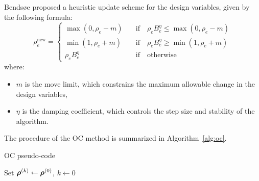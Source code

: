 \documentclass[mathpazo]{cicp}
\begin{document}
Bendsøe \cite{bendsoe1995optimization} proposed a heuristic update scheme for the design variables, given by the following formula:
\begin{equation*}
	\rho_e^{\mathrm{new}}=
	\begin{cases}
		\max(0,\rho_e-m)\quad&\text{if}\quad \rho_eB_e^\eta\leq\max(0,\rho_e-m)\\
		\min(1,\rho_e+m)\quad&\text{if}\quad\rho_eB_e^\eta \geq \min(1,\rho_e+m)\\
		\rho_eB_e^\eta\quad&\text{if}\quad\text{otherwise}
	\end{cases}
\end{equation*}
where: 
\begin{itemize} 
	\item $m$ is the move limit, which constrains the maximum allowable change in the design variables,
	\item $\eta$ is the damping coefficient, which controls the step size and stability of the algorithm. 
\end{itemize}

The procedure of the OC method is summarized in Algorithm~\ref{alg:oc}.
\vspace{-1ex}
\begin{algorithm}[H]
	\caption{OC pseudo-code}
	\label{alg:oc}
	\begin{minipage}{\textwidth}
		Set $\boldsymbol{\rho}^{(k)} \leftarrow \boldsymbol{\rho}^{(0)}$, $k \leftarrow 0$\;
		
	\end{minipage}
\end{algorithm}
\vspace{-1ex}
\end{document}
